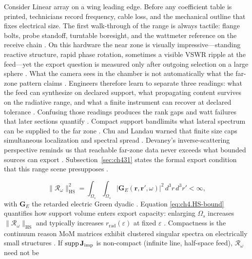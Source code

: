 \begin{physicalvignette}
Consider Linear array on a wing leading edge. Before any coefficient table is printed, technicians record frequency, cable loss, and the mechanical outline that fixes electrical size. The first walk-through of the range is always tactile: flange bolts, probe standoff, turntable boresight, and the wattmeter reference on the receive chain \cite{hansen1988}.
On this hardware the near zone is visually impressive---standing reactive structure, rapid phase rotation, sometimes a visible VSWR ripple at the feed---yet the export question is measured only after outgoing selection on a large sphere \cite{harrington2001}. What the camera sees in the chamber is not automatically what the far-zone pattern claims \cite{stratton1941}.
Engineers therefore learn to separate three readings: what the feed can synthesize on declared support, what propagating content survives on the radiative range, and what a finite instrument can recover at declared tolerance \cite{devaney2004}. Confusing those readings produces the rank gaps and watt failures that later sections quantify \cite{pal2026}.
Compact support bandlimits what lateral spectrum can be supplied to the far zone . 
Chu and Landau warned that finite size caps simultaneous localization and spectral spread \cite{chu1948}. Devaney's inverse-scattering perspective reminds us that reachable far-zone data never exceeds what bounded sources can export \cite{devaney2004}.
Subsection~\ref{sec:ch431} states the formal export condition that this range scene presupposes \cite{stratton1941}.
\end{physicalvignette}
\begin{equation}
\label{eq:ch4.HS-bound}
\|\mathcal{R}_\omega\|_{\mathrm{HS}}^{2}
=
\int_{\Omega_{s}}\!\int_{\Omega_{s}}
\big|\mathbf{G}_{E}(\mathbf{r},\mathbf{r}',\omega)\big|^{2}\,d^{3}r\,d^{3}r'
<
\infty,
\end{equation}
with \(\mathbf{G}_{E}\) the retarded electric Green dyadic \cite{stratton1941}. Equation
\eqref{eq:ch4.HS-bound} quantifies how support volume enters export capacity: enlarging \(\Omega_{s}\) increases
\(\|\mathcal{R}_\omega\|_{\mathrm{HS}}\) and typically increases \(r_{\mathrm{rad}}(\varepsilon)\) at fixed
\(\varepsilon\) \cite{devaney2004}. Compactness is the continuum reason MoM matrices exhibit clustered
singular spectra on electrically small structures \cite{harrington2001}.
\label{lem:ch4.noncompact-no-decay}
If \(\operatorname{supp}\mathbf{J}_{\mathrm{imp}}\) is non-compact (infinite line, half-space feed), \(\mathcal{R}_\omega\) need not be
